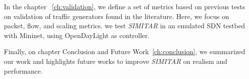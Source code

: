 In the chapter ~\ref{ch:validation}, we define a set of metrics based on previous tests on validation of traffic generators found in the literature. Here, we focus on packet, flow, and scaling metrics. we test \textit{SIMITAR} in an emulated SDN testbed with Mininet, using OpenDayLight as controller\cite{web-opendaylight}. 
 

Finally, on chapter Conclusion and Future Work~\ref{ch:conclusion}, we summarized our work and highlights future works to improve \textit{SIMITAR} on realism and performance.

